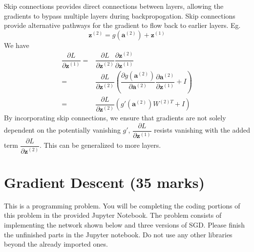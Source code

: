 \documentclass[12pt]{article}
\begin{document}
\begin{enumerate}[font=\Large]
\begin{enumerate}[label=(\alph*)]
		            Skip connections provides direct connections between layers, allowing the gradients to bypass multiple layers during backpropogation. Skip connections provide alternative pathways for the gradient to flow back to earlier layers. Eg.
		            $$\textbf{z}^{(2)} = g(\textbf{a}^{(2)}) + \textbf{z}^{(1)}$$
		            We have
		            $$
			            \begin{aligned}
				            \dfrac{\partial L}{\partial \textbf{z}^{(1)}}= & \dfrac{\partial L}{\partial \textbf{z}^{(2)}}\dfrac{\partial \textbf{z}^{(2)}}{\partial \textbf{z}^{(1)}}                                                                               \\
				            =                                              & \dfrac{\partial L}{\partial \textbf{z}^{(2)}}\left(\dfrac{\partial g(\textbf{a}^{(2)})}{\partial \textbf{a}^{(2)}}\dfrac{\partial \textbf{a}^{(2)}}{\partial \textbf{z}^{(1)}}+I\right) \\
				            =                                              & \dfrac{\partial L}{\partial \textbf{z}^{(2)}}(g'(\textbf{a}^{(2)})W^{(2)T}+I)
			            \end{aligned}
		            $$
		            By incorporating skip connections, we ensure that gradients are not solely dependent on the potentially vanishing $g'$, $\dfrac{\partial L}{\partial \textbf{z}^{(1)}}$ resists vanishing with the added term $\dfrac{\partial L}{\partial \textbf{z}^{(2)}}$. This can be generalized to more layers.
	      \end{enumerate}
\end{enumerate}

\newpage
\section{Gradient Descent (35 marks)}
This is a programming problem. You will be completing the coding portions of this problem in the provided Jupyter Notebook. The problem consists of implementing the network shown below and three versions of SGD. Please finish the unfinished parts in the Jupyter notebook. Do not use any other libraries beyond the already imported ones.
\end{document}
